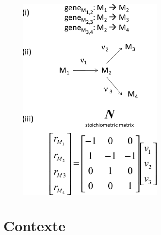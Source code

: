 \documentclass[11pt]{beamer}
\begin{document}
\begin{frame}
\begin{minipage}{4cm}
		\begin{figure}[h]
			\begin{center}
   				\begin{minipage}[c]{0.9\textwidth}
  					\includegraphics[scale=3]{modelem.png}
				 \end{minipage}
  			\end{center}	
		 \end{figure}
	\end{minipage}
\end{frame}

\section{Contexte}			
\end{document}
